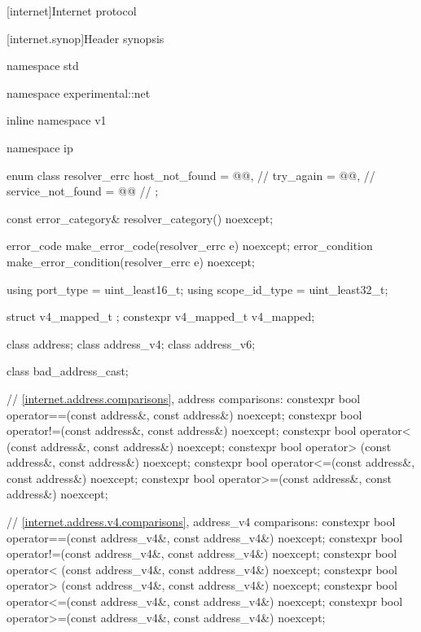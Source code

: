 
[internet]{Internet protocol}


%
[internet.synop]{Header  synopsis}

%
%
%
%
%
\begin{codeblock}
namespace std {
namespace experimental::net {
inline namespace v1 {
namespace ip {

  enum class resolver_errc {
    host_not_found = @@,   // 
    try_again = @@,        // 
    service_not_found = @@ // 
  };

  const error_category& resolver_category() noexcept;

  error_code make_error_code(resolver_errc e) noexcept;
  error_condition make_error_condition(resolver_errc e) noexcept;

  using port_type = uint_least16_t;
  using scope_id_type = uint_least32_t;

  struct v4_mapped_t {};
  constexpr v4_mapped_t v4_mapped;

  class address;
  class address_v4;
  class address_v6;

  class bad_address_cast;

  // \ref{internet.address.comparisons}, address comparisons:
  constexpr bool operator==(const address&, const address&) noexcept;
  constexpr bool operator!=(const address&, const address&) noexcept;
  constexpr bool operator< (const address&, const address&) noexcept;
  constexpr bool operator> (const address&, const address&) noexcept;
  constexpr bool operator<=(const address&, const address&) noexcept;
  constexpr bool operator>=(const address&, const address&) noexcept;

  // \ref{internet.address.v4.comparisons}, address_v4 comparisons:
  constexpr bool operator==(const address_v4&, const address_v4&) noexcept;
  constexpr bool operator!=(const address_v4&, const address_v4&) noexcept;
  constexpr bool operator< (const address_v4&, const address_v4&) noexcept;
  constexpr bool operator> (const address_v4&, const address_v4&) noexcept;
  constexpr bool operator<=(const address_v4&, const address_v4&) noexcept;
  constexpr bool operator>=(const address_v4&, const address_v4&) noexcept;

}}}}
\end{codeblock}
